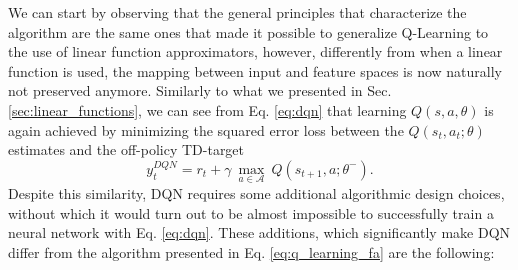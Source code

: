 We can start by observing that the general principles that characterize the algorithm are the same ones that made it possible to generalize Q-Learning to the use of linear function approximators, however, differently from when a linear function is used, the mapping between input and feature spaces is now naturally not preserved anymore. Similarly to what we presented in Sec. \ref{sec:linear_functions}, we can see from Eq. \ref{eq:dqn} that learning $Q(s,a,\theta)$ is again achieved by minimizing the squared error loss between the $Q(s_t,a_t;\theta)$ estimates and the off-policy TD-target
\begin{equation}
    y^{DQN}_{t} = r_{t} + \gamma \: \underset{a\in \mathcal{A}}{\max}\: Q(s_{t+1}, a; \theta^{-}).
\label{eq:dqn_td}
\end{equation}
Despite this similarity, DQN requires some additional algorithmic design choices, without which it would turn out to be almost impossible to successfully train a neural network with Eq. \ref{eq:dqn}. These additions, which significantly make DQN differ from the algorithm presented in Eq. \ref{eq:q_learning_fa} are the following:
